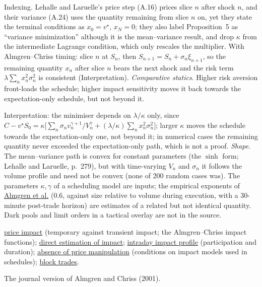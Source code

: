 \begin{qfmodel}
 Indexing. Lehalle and Laruelle's price step (A.16) prices slice $n$ after shock $n$, and their variance (A.24) uses the quantity remaining from slice $n$ on, yet they state the terminal conditions as $x_0=v^\star$, $x_N=0$; they also label Proposition~5 as ``variance minimization'' although it is the mean--variance result, and drop $\kappa$ from the intermediate Lagrange condition, which only rescales the multiplier. With Almgren--Chriss timing: slice $n$ at $S_n$, then $S_{n+1}=S_n+\sigma_n\xi_{n+1}$, so the remaining quantity $x_n$ after slice $n$ bears the next shock and the risk term $\lambda\sum_nx_n^2\sigma_n^2$ is consistent (Interpretation). \emph{Comparative statics}. Higher risk aversion front-loads the schedule; higher impact sensitivity moves it back towards the expectation-only schedule, but not beyond it.

Interpretation: the minimiser depends on $\lambda/\kappa$ only, since $C-v^\star S_0=\kappa\bigl[\sum_n\sigma_nv_n^{\gamma+1}/V_n^\gamma+(\lambda/\kappa)\sum_nx_n^2\sigma_n^2\bigr]$; larger $\kappa$ moves the schedule towards the expectation-only one, not beyond it; in numerical cases the remaining quantity never exceeded the expectation-only path, which is not a proof. \emph{Shape}. The mean--variance path is convex for constant parameters (the $\sinh$ form; Lehalle and Laruelle, p.~279), but with time-varying $V_n$ and $\sigma_n$ it follows the volume profile and need not be convex (none of 200 random cases was). The parameters $\kappa,\gamma$ of a scheduling model are inputs; the empirical exponents of \hyperref[meth:almgren-impact-estimation]{Almgren et al.} (0.6, against size relative to volume during execution, with a 30-minute post-trade horizon) are estimates of a related but not identical quantity. Dark pools and limit orders in a tactical overlay are not in the source.

 \hyperref[def:price-impact]{price impact} (temporary against transient impact; the Almgren--Chriss impact functions); \hyperref[meth:almgren-impact-estimation]{direct estimation of impact}; \hyperref[ev:intraday-impact-profile]{intraday impact profile} (participation and duration); \hyperref[res:no-price-manipulation]{absence of price manipulation} (conditions on impact models used in schedules); \hyperref[def:block-trade]{block trades}.

 The journal version of Almgren and Chriss (2001).

\end{qfmodel}


